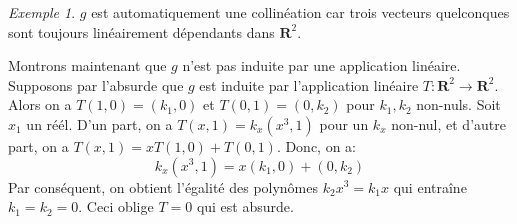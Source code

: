 \documentclass[12pt, oneside]{memoir}
\theoremstyle{definition}
\newtheorem{defn}{Définition}
\theoremstyle{remark}
\newtheorem{exm}{Exemple}
\newcommand*{\DashedArrow}[1][]{\mathbin{\tikz
    [baseline=-0.25ex,-latex, dashed,#1] \draw [#1] (0pt,0.5ex) --
    (1.3em,0.5ex);}}%
\newcommand{\partialto}{\DashedArrow[->,dash pattern=on 4pt off 2pt]}
\DeclareMathOperator{\kernel}{Ker}
\DeclareMathOperator{\domain}{Dom}
\newcommand{\R}{\mathbf{R}}
\begin{document}
\begin{exm}
  $g$ est automatiquement une collinéation car trois vecteurs quelconques sont
  toujours linéairement dépendants dans $\R^2$.

  Montrons maintenant que $g$ n'est pas induite par une application linéaire.
  Supposons par l'absurde que $g$ est induite par l'application linéaire
  $T : \R^{2} \to \R^{2}$. Alors on a $T(1, 0) = (k_{1}, 0)$ et
  $T(0, 1) = (0, k_{2})$ pour $k_{1}, k_{2}$ non-nuls. Soit $x_{1}$ un réél.
  D'un part, on a $T(x, 1) = k_{x} (x^{3}, 1)$ pour un $k_{x}$ non-nul, et
  d'autre part, on a $T(x, 1) = x T(1, 0) + T(0, 1)$. Donc, on a:
  $$
  k_{x} (x^{3}, 1) = x (k_{1}, 0) + (0, k_{2})
  $$
  Par conséquent, on obtient l'égalité des polynômes $k_{2}x^{3} = k_{1}x$ qui
  entraîne $k_{1} = k_{2} = 0$. Ceci oblige $T = 0$ qui est absurde.
\end{exm}
\end{document}
